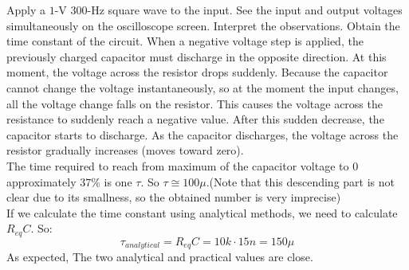 \documentclass[11pt]{article}
\begin{document}
\begin{question}
\begin{subquestion}{Apply a $1$-V $300$-Hz square wave to the input. See the input and output voltages simultaneously on the oscilloscope screen. Interpret the observations. Obtain the time constant of the circuit.}
{            When a negative voltage step is applied, the previously charged capacitor must discharge in the opposite direction. At this moment, the voltage across the resistor drops suddenly. Because the capacitor cannot change the voltage instantaneously, so at the moment the input changes, all the voltage change falls on the resistor. This causes the voltage across the resistance to suddenly reach a negative value. After this sudden decrease, the capacitor starts to discharge. As the capacitor discharges, the voltage across the resistor gradually increases (moves toward zero). \\

            The time required to reach from maximum of the capacitor voltage to $0$ approximately $37\%$ is one $\tau$. So $\tau \cong 100\mu$.(Note that this descending part is not clear due to its smallness, so the obtained number is very imprecise) \\
            If we calculate the time constant using analytical methods, we need to calculate $R_{eq}C$. So:
            \[
                \tau_{analytical} = R_{eq}C = 10k \cdot 15n = 150\mu
            \]
            As expected, The two analytical and practical values are close.
        }
    \end{subquestion}


\end{question}
\end{document}

